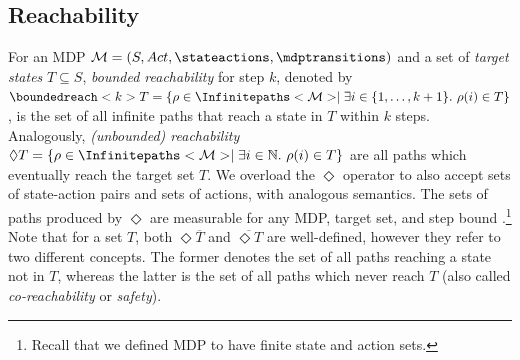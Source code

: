 \documentclass{article}
\newcommand{\setcomplement}[1]{\overline{#1}}
\newcommand{\Naturals}{\mathbb{N}}
\newcommand{\MDP}{\mathcal{M}}
\newcommand{\States}{S}
\newcommand{\Actions}{Act}
\newcommand{\infinitepath}{\rho}
\newcommand{\reach}{\Diamond}
\newcommand{\targetset}{T}
\begin{document}
\subsection{Reachability}
For an MDP $\MDP = (\States, \Actions, \stateactions, \mdptransitions)$ and a set of \emph{target states} $T \subseteq \States$, \emph{bounded reachability} for step $k$, denoted by $\boundedreach<k> T = \{\infinitepath \in \Infinitepaths<\MDP> \mid \exists i \in \{1, \dots, k + 1\}.~\infinitepath(i) \in T\}$, is the set of all infinite paths that reach a state in $T$ within $k$ steps.
Analogously, \emph{(unbounded) reachability} $\reach T = \{\infinitepath \in \Infinitepaths<\MDP> \mid \exists i \in \Naturals.~\infinitepath(i) \in T\}$ are all paths which eventually reach the target set $T$.
We overload the $\reach$ operator to also accept sets of state-action pairs and sets of actions, with analogous semantics.
The sets of paths produced by $\reach$ are measurable for any MDP, target set, and step bound \cite[Section~10.1.1]{DBLP:books/daglib/0020348}.\footnote{Recall that we defined MDP to have finite state and action sets.}
Note that for a set $\targetset$, both $\reach \setcomplement{\targetset}$ and $\setcomplement{\reach \targetset}$ are well-defined, however they refer to two different concepts.
The former denotes the set of all paths reaching a state not in $\targetset$, whereas the latter is the set of all paths which never reach $\targetset$ (also called \emph{co-reachability} or \emph{safety}).
\end{document}
